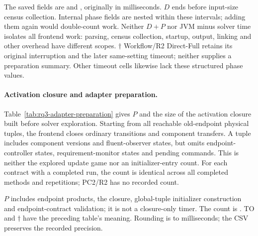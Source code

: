 \documentclass[11pt]{article}
\begin{document}
\begin{table}[!htbp]\centering
\caption{Definition preparation $D$, in seconds: five-run median [minimum--maximum]. TO is the process outcome; it does not locate the timeout within preparation or search.}
\label{tab:rq3-definition-preparation}

\end{table}

\noindent\footnotesize
The saved fields are  and , originally in milliseconds. $D$ ends before input-size census collection. Internal phase fields are nested within these intervals; adding them again would double-count work. Neither $D+P$ nor JVM minus solver time isolates all frontend work: parsing, census collection, startup, output, linking and other overhead have different scopes. $\dagger$ Workflow/R2 Direct-Full retains its original interruption and the later same-setting timeout; neither supplies a preparation summary. Other timeout cells likewise lack these structured phase values.
\normalsize

\clearpage
\paragraph{Activation closure and adapter preparation.}
Table~\ref{tab:rq3-adapter-preparation} gives $P$ and the size of the activation closure built before solver exploration. Starting from all reachable old-endpoint physical tuples, the frontend closes ordinary transitions and component transfers. A tuple includes component versions and fluent-observer states, but omits endpoint-controller states, requirement-monitor states and pending commands. This is neither the explored update game nor an initializer-entry count. For each contract with a completed run, the count is identical across all completed methods and repetitions; PC2/R2 has no recorded count.

\begin{table}[!htbp]\centering
\caption{Adapter preparation $P$, in seconds: five-run median [minimum--maximum], and precomputed activation-closure tuples. All 27 contracts and four methods remain visible.}
\label{tab:rq3-adapter-preparation}

\end{table}

\noindent\footnotesize
$P$ includes endpoint products, the closure, global-tuple initializer construction and endpoint-contract validation; it is not a closure-only timer. The count is . TO and $\dagger$ have the preceding table's meaning. Rounding is to milliseconds; the CSV preserves the recorded precision.
\normalsize
\end{document}
